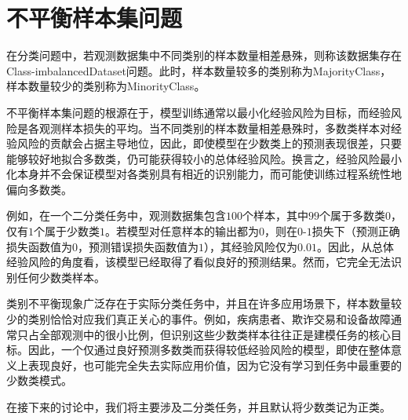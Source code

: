 \section{不平衡样本集问题}

\begin{definition}
	在分类问题中，若观测数据集中不同类别的样本数量相差悬殊，则称该数据集存在\gls{Class-imbalancedDataset}问题。此时，样本数量较多的类别称为\gls{MajorityClass}，样本数量较少的类别称为\gls{MinorityClass}。
\end{definition}
不平衡样本集问题的根源在于，模型训练通常以最小化经验风险为目标，而经验风险是各观测样本损失的平均。当不同类别的样本数量相差悬殊时，多数类样本对经验风险的贡献会占据主导地位，因此，即使模型在少数类上的预测表现很差，只要能够较好地拟合多数类，仍可能获得较小的总体经验风险。换言之，经验风险最小化本身并不会保证模型对各类别具有相近的识别能力，而可能使训练过程系统性地偏向多数类。\par
例如，在一个二分类任务中，观测数据集包含$100$个样本，其中$99$个属于多数类$0$，仅有$1$个属于少数类$1$。若模型对任意样本的输出都为$0$，则在$0$-$1$损失下（预测正确损失函数值为$0$，预测错误损失函数值为$1$），其经验风险仅为$0.01$。因此，从总体经验风险的角度看，该模型已经取得了看似良好的预测结果。然而，它完全无法识别任何少数类样本。\par
类别不平衡现象广泛存在于实际分类任务中，并且在许多应用场景下，样本数量较少的类别恰恰对应我们真正关心的事件。例如，疾病患者、欺诈交易和设备故障通常只占全部观测中的很小比例，但识别这些少数类样本往往正是建模任务的核心目标。因此，一个仅通过良好预测多数类而获得较低经验风险的模型，即使在整体意义上表现良好，也可能完全失去实际应用价值，因为它没有学习到任务中最重要的少数类模式。\par
在接下来的讨论中，我们将主要涉及二分类任务，并且默认将少数类记为正类。


